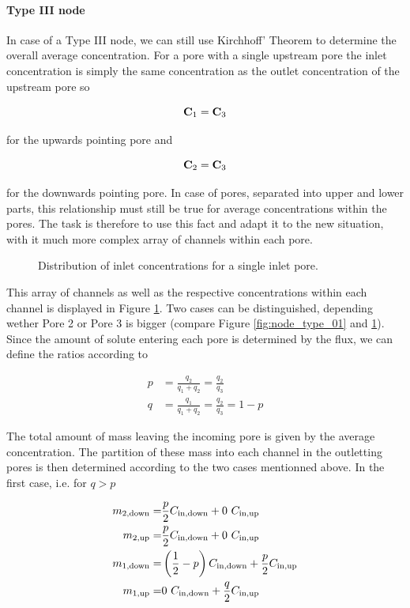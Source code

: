 \documentclass[12pt]{report}
\newcommand*{\PsTricksPath}{pstricks}
\begin{document}
\paragraph*{Type III node} In case of a Type III node, we can still use Kirchhoff' Theorem to determine the overall average concentration. For a pore with a single upstream pore the inlet concentration is simply the same concentration as the outlet concentration of the upstream pore so

$$
	{\bf C}_1 = {\bf C}_3
$$

for the upwards pointing pore and 

$$
	{\bf C}_2 = {\bf C}_3
$$

for the downwards pointing pore. In case of pores, separated into upper and lower parts, this relationship must still be true for average concentrations within the pores. The task is therefore to use this fact and adapt it to the new situation, with it much more complex array of channels within each pore. 

\begin{figure}[ht]
	\centering
	
	\caption{Distribution of inlet concentrations for a single inlet pore.}
	\label{fig:cIn_single_inlet}
\end{figure}

This array of channels as well as the respective concentrations within each channel is displayed in Figure \ref{fig:cIn_single_inlet}. Two cases can be distinguished, depending wether Pore 2 or Pore 3 is bigger (compare Figure \ref{fig:node_type_01} and \ref{fig:cIn_single_inlet}). Since the amount of solute entering each pore is determined by the flux, we can define the ratios according to

\begin{subequations}
\begin{align}
	 p & = \frac{q_2}{q_1 + q_2} = \frac{q_2}{q_3} \\
	 q & = \frac{q_1}{q_1 + q_2} = \frac{q_2}{q_3} = 1 - p
\end{align}
\end{subequations}

The total amount of mass leaving the incoming pore is given by the average concentration. The partition of these mass into each channel in the outletting pores is then determined according to the two cases mentionned above. In the first case, i.e. for $q>p$

\begin{subequations}
\begin{align}
	m_{2,\rm{down}} = & \frac{p}{2} C_{\rm{in, down}} + 0\ C_{\rm{in, up}} \\
	m_{2,\rm{up}}   = & \frac{p}{2} C_{\rm{in, down}} + 0\ C_{\rm{in, up}} \\
	m_{1,\rm{down}} = & \left( \frac12 - p \right) C_{\rm{in, down}} + \frac{p}{2} C_{\rm{in, up}} \\
	m_{1,\rm{up}}   = & 0\ C_{\rm{in, down}} + \frac{q}{2} C_{\rm{in, up}}
\end{align}
\end{subequations}
\end{document}
